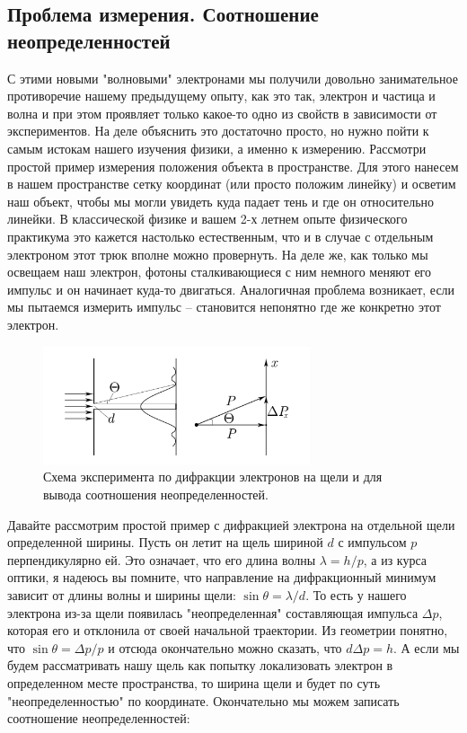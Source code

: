 \documentclass[12pt]{article}
\begin{document}
\subsection{Проблема измерения. Соотношение неопределенностей}
С этими новыми "волновыми" электронами мы получили довольно занимательное противоречие нашему предыдущему опыту, как это так, электрон и частица и волна и при этом проявляет только какое-то одно из свойств в зависимости от экспериментов. На деле объяснить это достаточно просто, но нужно пойти к самым истокам нашего изучения физики, а именно к измерению. Рассмотри простой пример измерения положения объекта в пространстве. Для этого нанесем в нашем пространстве сетку координат (или просто положим линейку) и осветим наш объект, чтобы мы могли увидеть куда падает тень и где он относительно линейки. В классической физике и вашем 2-х летнем опыте физического практикума это кажется настолько естественным, что и в случае с отдельным электроном этот трюк вполне можно провернуть. На деле же, как только мы освещаем наш электрон, фотоны сталкивающиеся с ним немного меняют его импульс и он начинает куда-то двигаться. Аналогичная проблема возникает, если мы пытаемся измерить импульс -- становится непонятно где же конкретно этот электрон. \\
\begin{figure}[h]
    \centering
    \includegraphics[width=0.7\textwidth,keepaspectratio]{Seminar_03/pics/pic_02.png}
    \caption{Схема эксперимента по дифракции электронов на щели и для вывода соотношения неопределенностей.}
    \label{fig:sem_03_electron_diffraction}
\end{figure}
Давайте рассмотрим простой пример с дифракцией электрона на отдельной щели определенной ширины. Пусть он летит на щель шириной $d$ с импульсом $p$ перпендикулярно ей. Это означает, что его длина волны $\lambda = h/p$, а из курса оптики, я надеюсь вы помните, что направление на дифракционный минимум зависит от длины волны и ширины щели: $\sin{\theta} = \lambda/d$. То есть у нашего электрона из-за щели появилась "неопределенная" составляющая импульса $\Delta p$, которая его и отклонила от своей начальной траектории. Из геометрии понятно, что $\sin{\theta} = \Delta p / p$ и отсюда окончательно можно сказать, что $d\Delta p = h$. А если мы будем рассматривать нашу щель как попытку локализовать электрон в определенном месте пространства, то ширина щели и будет по суть "неопределенностью" по координате. Окончательно мы можем записать соотношение неопределенностей:
\end{document}
